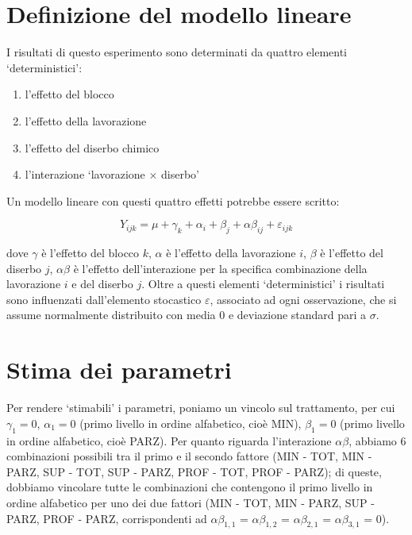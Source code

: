 \documentclass[a4paper,12pt,oneside]{book}
\providecommand{\tightlist}{%
  \setlength{\itemsep}{0pt}\setlength{\parskip}{0pt}}
\begin{document}
\hypertarget{definizione-del-modello-lineare}{%
\section{Definizione del modello lineare}\label{definizione-del-modello-lineare}}

I risultati di questo esperimento sono determinati da quattro elementi `deterministici':

\begin{enumerate}
\def\labelenumi{\arabic{enumi}.}
\tightlist
\item
  l'effetto del blocco
\item
  l'effetto della lavorazione
\item
  l'effetto del diserbo chimico
\item
  l'interazione `lavorazione \(\times\) diserbo'
\end{enumerate}

Un modello lineare con questi quattro effetti potrebbe essere scritto:

\[Y_{ijk} = \mu + \gamma_k + \alpha_i + \beta_j + \alpha\beta_{ij} + \varepsilon_{ijk}\]

dove \(\gamma\) è l'effetto del blocco \(k\), \(\alpha\) è l'effetto della lavorazione \(i\), \(\beta\) è l'effetto del diserbo \(j\), \(\alpha\beta\) è l'effetto dell'interazione per la specifica combinazione della lavorazione \(i\) e del diserbo \(j\). Oltre a questi elementi `deterministici' i risultati sono influenzati dall'elemento stocastico \(\varepsilon\), associato ad ogni osservazione, che si assume normalmente distribuito con media 0 e deviazione standard pari a \(\sigma\).

\hypertarget{stima-dei-parametri-2}{%
\section{Stima dei parametri}\label{stima-dei-parametri-2}}

Per rendere `stimabili' i parametri, poniamo un vincolo sul trattamento, per cui \(\gamma_1 = 0\), \(\alpha_1 = 0\) (primo livello in ordine alfabetico, cioè MIN), \(\beta_1 = 0\) (primo livello in ordine alfabetico, cioè PARZ). Per quanto riguarda l'interazione \(\alpha\beta\), abbiamo 6 combinazioni possibili tra il primo e il secondo fattore (MIN - TOT, MIN - PARZ, SUP - TOT, SUP - PARZ, PROF - TOT, PROF - PARZ); di queste, dobbiamo vincolare tutte le combinazioni che contengono il primo livello in ordine alfabetico per uno dei due fattori (MIN - TOT, MIN - PARZ, SUP - PARZ, PROF - PARZ, corrispondenti ad \(\alpha\beta_{1,1}\) = \(\alpha\beta_{1,2}\) = \(\alpha\beta_{2,1}\) = \(\alpha\beta_{3,1}\) = 0).
\end{document}
